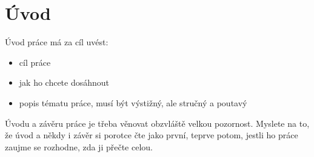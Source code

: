 \chapter*{Úvod}
Úvod práce má za cíl uvést:
\begin{itemize}
    \item cíl práce
    \item jak ho chcete dosáhnout
    \item popis tématu práce, musí být výstižný, ale stručný a poutavý
\end{itemize}

Úvodu a závěru práce je třeba věnovat obzvláště velkou pozornost.
Myslete na to, že úvod a někdy i závěr si porotce čte jako první, teprve potom, jestli ho práce zaujme se rozhodne, zda ji přečte celou.
\newpage
